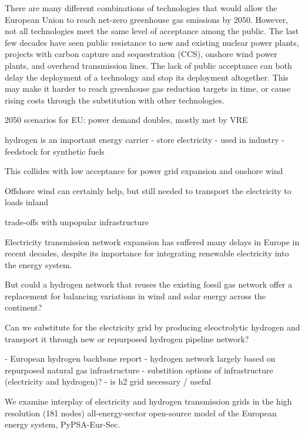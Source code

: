 
There are many different combinations of technologies that would allow
the European Union to reach net-zero greenhouse gas emissions by
2050. However, not all technologies meet the same level of acceptance
among the public. The last few decades have seen public resistance to
new and existing nuclear power plants, projects with carbon capture
and sequestration (CCS), onshore wind power plants, and overhead
transmission lines. The lack of public acceptance can both delay the
deployment of a technology and stop its deployment altogether. This
may make it harder to reach greenhouse gas reduction targets in time,
or cause rising costs through the substitution with other
technologies.

2050 scenarios for EU: power demand doubles, mostly met by VRE

hydrogen is an important energy carrier
- store electricity
- used in industry
- feedstock for synthetic fuels

This collides with low acceptance for power grid expansion and onshore wind

Offshore wind can certainly help, but still needed to transport the electricity to loads inland

trade-offs with unpopular infrastructure

Electricity transmission network expansion has suffered many delays in
Europe in recent decades, despite its importance for integrating
renewable electricity into the energy system.

But could a hydrogen
network that reuses the existing fossil gas network offer a replacement
for balancing variations in wind and solar energy across the continent?

Can we substitute for the electricity grid by producing eleoctrolytic hydrogen
and transport it through new or repurposed hydrogen pipeline network?


- European hydrogen backbone report
- hydrogen network largely based on repurposed natural gas infrastructure
- substition options of infrastructure (electricity and hydrogen)?
- is h2 grid necessary / useful


We examine interplay of electricity and hydrogen transmission grids in the high
resolution (181 nodes) all-energy-sector open-source model of the European
energy system, PyPSA-Eur-Sec.


